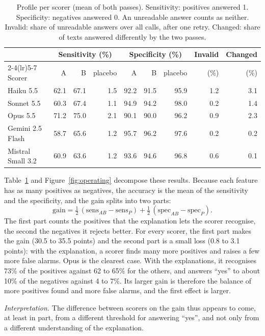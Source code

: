 \documentclass[11pt]{article}
\begin{document}
\begin{table}[t]
\centering
\small
\begin{tabular}{lrrrrrrrr}
\toprule
& \multicolumn{3}{c}{Sensitivity (\%)} & \multicolumn{3}{c}{Specificity (\%)} & Invalid & Changed \\
\cmidrule(lr){2-4}\cmidrule(lr){5-7}
Scorer & A & B & placebo & A & B & placebo & (\%) & (\%) \\
\midrule
Haiku 5.5 & 62.1 & 67.1 & 1.5 & 92.2 & 91.5 & 95.9 & 1.2 & 3.1 \\
Sonnet 5.5 & 60.3 & 67.4 & 1.1 & 94.9 & 94.2 & 98.0 & 0.2 & 1.4 \\
Opus 5.5 & 71.2 & 75.0 & 2.1 & 90.1 & 90.0 & 96.2 & 0.9 & 2.3 \\
Gemini 2.5 Flash & 58.7 & 65.6 & 1.2 & 95.7 & 96.2 & 97.6 & 0.2 & 0.2 \\
Mistral Small 3.2 & 60.9 & 63.6 & 1.2 & 93.6 & 94.6 & 96.8 & 0.6 & 0.1 \\
\bottomrule
\end{tabular}
\caption{Profile per scorer (mean of both passes). Sensitivity: positives answered 1.
Specificity: negatives answered 0. An unreadable answer counts as neither. Invalid:
share of unreadable answers over all calls, after one retry. Changed: share of texts
answered differently by the two passes.}
\label{tab:profile}
\end{table}

Table~\ref{tab:profile} and Figure~\ref{fig:operating} decompose these results.
Because each feature has as many positives as negatives, the accuracy is the mean of
the sensitivity and the specificity, and the gain splits into two parts:
\[
\text{gain} = \tfrac{1}{2}\,(\text{sens}_{AB} - \text{sens}_{P}) + \tfrac{1}{2}\,(\text{spec}_{AB} - \text{spec}_{P}).
\]
The first part counts the positives that the explanation lets the scorer recognise,
the second the negatives it rejects better. For every scorer, the first part makes
the gain (30.5 to 35.5 points) and the second part is a small loss (0.8 to 3.1
points): with the explanation, a scorer finds many more positives and raises a few
more false alarms. Opus is the clearest case. With the explanations, it recognises
73\% of the positives against 62 to 65\% for the others, and answers ``yes'' to about
10\% of the negatives against 4 to 7\%. Its larger gain is therefore the balance of
more positives found and more false alarms, and the first effect is larger.


\textit{Interpretation.} The difference between scorers on the gain thus appears to come, at least in
part, from a different threshold for answering ``yes'', and not only from a different
understanding of the explanation.
\end{document}
